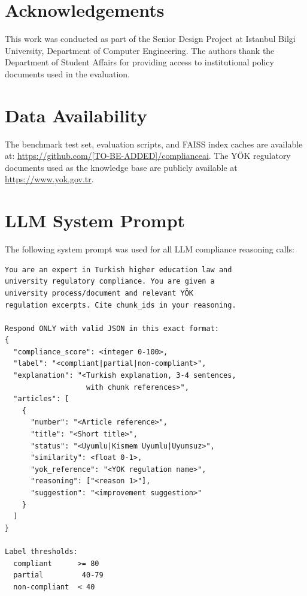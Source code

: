 \documentclass[a4paper,fleqn]{cas-dc}
\begin{document}
\section*{Acknowledgements}
This work was conducted as part of the Senior Design Project at Istanbul Bilgi
University, Department of Computer Engineering. The authors thank the
Department of Student Affairs for providing access to institutional policy
documents used in the evaluation.

\section*{Data Availability}
The benchmark test set, evaluation scripts, and FAISS index caches are
available at: \url{https://github.com/[TO-BE-ADDED]/complianceai}.
The YÖK regulatory documents used as the knowledge base are publicly available
at \url{https://www.yok.gov.tr}.




\appendix
\section{LLM System Prompt}
\label{app:prompt}

The following system prompt was used for all LLM compliance reasoning calls:

\begin{verbatim}
You are an expert in Turkish higher education law and
university regulatory compliance. You are given a
university process/document and relevant YÖK
regulation excerpts. Cite chunk_ids in your reasoning.

Respond ONLY with valid JSON in this exact format:
{
  "compliance_score": <integer 0-100>,
  "label": "<compliant|partial|non-compliant>",
  "explanation": "<Turkish explanation, 3-4 sentences,
                   with chunk references>",
  "articles": [
    {
      "number": "<Article reference>",
      "title": "<Short title>",
      "status": "<Uyumlu|Kismem Uyumlu|Uyumsuz>",
      "similarity": <float 0-1>,
      "yok_reference": "<YOK regulation name>",
      "reasoning": ["<reason 1>"],
      "suggestion": "<improvement suggestion>"
    }
  ]
}

Label thresholds:
  compliant      >= 80
  partial         40-79
  non-compliant  < 40
\end{verbatim}
\end{document}
